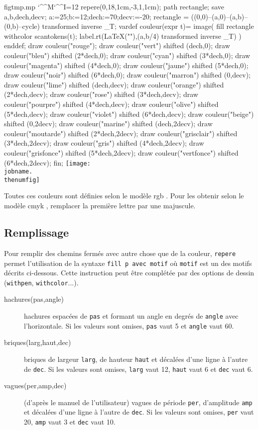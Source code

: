 \documentclass[11pt,a4paper,french]{article}
\makeatletter
\def\verbatimwrite{%
  \@bsphack
  \immediate\openout \temp@code figtmp.mp
  \let\do\@makeother\dospecials
  \catcode`\^^M\active \catcode`\^^I=12
  \def\verbatim@processline{%
    \immediate\write\verbatim@out
      {\the\verbatim@line}%
    \immediate\write\temp@code
          {\the\verbatim@line}
     }%
  \verbatim@start}
\def\endverbatimwrite{%
  \immediate\closeout\temp@code
  \@esphack
  }%
\newcounter{numfig}
\newenvironment{figreperedoc}%
                  {\refstepcounter{numfig}
                   \verbatimwrite}%
                   {%
                   \endverbatimwrite%
                   \IfFileExists{\jobname.\thenumfig}%
                      {\texttt{[image: \\jobname.\\thenumfig]}}{}
                   }
\makeatother
\begin{document}
\begin{center}
\begin{figreperedoc}
repere(0,18,1cm,-3,1,1cm);
 path rectangle;
 save a,b,dech,decv;
 a:=25;b:=12;dech:=70;decv:=-20;
 rectangle = ((0,0)--(a,0)--(a,b)--(0,b)--cycle) transformed inverse _T;
 vardef couleur(expr t)=
    image(%
          fill rectangle withcolor scantokens(t);
          label.rt(LaTeX(""),(a,b/4) transformed inverse _T)
          )
 enddef;
 draw couleur("rouge");
 draw couleur("vert") shifted (dech,0);
 draw couleur("bleu") shifted (2*dech,0);
 draw couleur("cyan") shifted (3*dech,0);
 draw couleur("magenta") shifted (4*dech,0);
 draw couleur("jaune") shifted (5*dech,0);
 draw couleur("noir") shifted (6*dech,0);
 draw couleur("marron") shifted (0,decv);
 draw couleur("lime") shifted (dech,decv);
 draw couleur("orange") shifted (2*dech,decv);
 draw couleur("rose") shifted (3*dech,decv);
 draw couleur("pourpre") shifted (4*dech,decv);
 draw couleur("olive") shifted (5*dech,decv);
 draw couleur("violet") shifted (6*dech,decv);
 draw couleur("beige") shifted (0,2decv);
 draw couleur("marine") shifted (dech,2decv);
 draw couleur("moutarde") shifted (2*dech,2decv);
 draw couleur("grisclair") shifted (3*dech,2decv);
 draw couleur("gris") shifted (4*dech,2decv);
 draw couleur("grisfonce") shifted (5*dech,2decv);
 draw couleur("vertfonce") shifted (6*dech,2decv);
fin;
\end{figreperedoc}
\end{center}

Toutes ces couleurs sont définies selon le modèle \og rgb \fg. Pour les obtenir selon le modèle \og cmyk \fg, remplacer la première lettre par une majuscule.


\subsection{Remplissage}
Pour remplir des chemins fermés avec autre chose que de la couleur, \verb+repere+ permet l'utilisation de la syntaxe \verb+fill p avec motif+ où \verb+motif+ est un des motifs décrits ci-dessous. Cette instruction peut être complétée par des options de dessin (\verb+withpen+, \verb+withcolor+...).

\begin{description}
\item[hachures(pas,angle)] hachures espacées de \verb+pas+ et formant un angle en degrés de \verb+angle+ avec l'horizontale. Si les valeurs sont omises, \verb|pas| vaut 5 et \verb+angle+ vaut 60.


\item[briques(larg,haut,dec)] briques de largeur \verb+larg+, de hauteur \verb+haut+ et décalées d'une ligne à l'autre de \verb+dec+. Si les valeurs sont omises, \verb|larg| vaut 12, \verb|haut| vaut 6 et \verb+dec+ vaut 6.


\item[vagues(per,amp,dec)] (d'après le manuel de l'utilisateur) \og vagues \fg{} de période \verb+per+, d'amplitude \verb+amp+ et décalées d'une ligne à l'autre de \verb+dec+. Si les valeurs sont omises, \verb|per| vaut 20, \verb|amp| vaut 3 et \verb+dec+ vaut 10.
\end{description}
\end{document}
